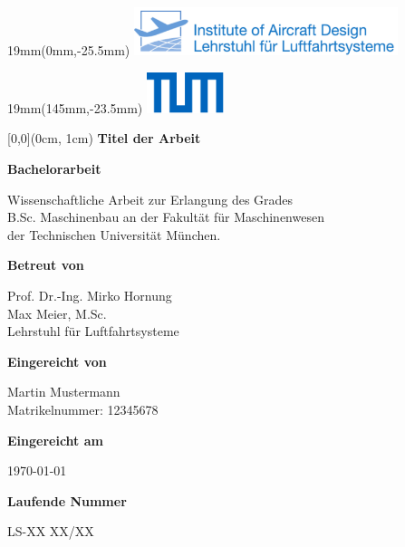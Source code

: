 \setlength{\parindent}{0pt}
\setlength{\parskip}{\baselineskip}
\TabPositions{4cm}
\pagestyle{empty}

\textblockorigin{20mm}{43.5mm} %

\begin{textblock*}{19mm}(0mm,-25.5mm)
\includegraphics[height = 14mm, keepaspectratio=true]{Abbildungen/LLS_Logo_deu_engl.pdf}
\end{textblock*}

\begin{textblock*}{19mm}(145mm,-23.5mm)
\includegraphics[height = 12mm, keepaspectratio=true]{Abbildungen/Universitaet_Logo_RGB.pdf}
\end{textblock*}

\begin{textblock*}{\textwidth}[0,0](0cm, 1cm)%
{\fontsize{24pt}{26pt}\selectfont\textbf{Titel der Arbeit}}

\vspace*{14pt}
{\fontsize{14pt}{22pt}\selectfont\textbf{Bachelorarbeit}}
\end{textblock*}
    
\vspace*{92.2mm}
\fontsize{15pt}{17.5pt}\selectfont%
Wissenschaftliche Arbeit zur Erlangung des Grades\\
B.Sc. Maschinenbau an der Fakultät für Maschinenwesen \\
der Technischen Universität München.

\renewcommand{\baselinestretch}{1.47}
\normalsize\selectfont
\vspace*{17.1mm}
\textbf{Betreut von}\tab
\begin{minipage}[t]{\textwidth}
Prof. Dr.-Ing. Mirko Hornung\\
Max Meier, M.Sc.\\
Lehrstuhl für Luftfahrtsysteme\strut
\end{minipage}

\vspace*{1.3mm}
\textbf{Eingereicht von}\tab
\begin{minipage}[t]{\textwidth}%
Martin Mustermann\\
Matrikelnummer: 12345678\strut
\end{minipage}

\vspace*{1.3mm}
\textbf{Eingereicht am}\tab 
\begin{minipage}[t]{\textwidth}%
\today\strut
\end{minipage}

\vspace*{1.3mm}
\textbf{Laufende Nummer}\tab 
\begin{minipage}[t]{\textwidth}%
LS-XX XX/XX
\end{minipage}

\restoregeometry